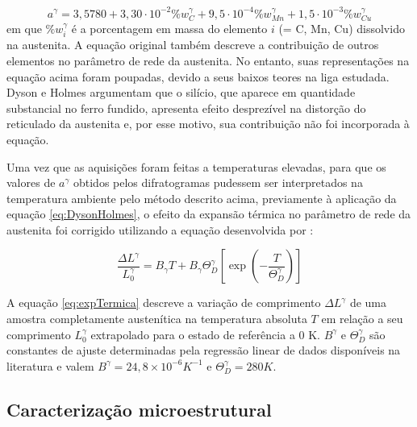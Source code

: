 \begin{equation}
	a^\gamma = 3,5780 + 3,30\cdot10^{-2} \%w_C^\gamma + 9,5\cdot10^{-4} \%w_{Mn}^\gamma + 1,5\cdot10^{-3} \%w_{Cu}^\gamma
	\label{eq:DysonHolmes}
\end{equation}
%
em que $\%w_i^\gamma$ é a porcentagem em massa do elemento $i$ (= C, Mn, Cu) dissolvido na austenita. A equação original também descreve a contribuição de outros elementos no parâmetro de rede da austenita. No entanto, suas representações na equação acima foram poupadas, devido a seus baixos teores na liga estudada. Dyson e Holmes argumentam que o silício, que aparece em quantidade substancial no ferro fundido, apresenta efeito desprezível na distorção do reticulado da austenita e, por esse motivo, sua contribuição não foi incorporada à equação.

Uma vez que as aquisições foram feitas a temperaturas elevadas, para que os valores de $a^\gamma$ obtidos pelos difratogramas pudessem ser interpretados na temperatura ambiente pelo método descrito acima, previamente à aplicação da equação \ref{eq:DysonHolmes}, o efeito da expansão térmica no parâmetro de rede da austenita foi corrigido utilizando a equação desenvolvida por :

\begin{equation}
	\frac{\Delta L^\gamma}{L_0^\gamma} = B_\gamma T + B_\gamma \Theta_D^\gamma \left[ \exp{\left( -\frac{T}{\Theta_D^\gamma} \right)}\right]
	\label{eq:expTermica}
\end{equation}

A equação \ref{eq:expTermica} descreve a variação de comprimento $\Delta L^\gamma$ de uma amostra completamente austenítica na temperatura absoluta $T$ em relação a seu comprimento $L_0^\gamma$ extrapolado para o estado de referência a 0 K. $B^\gamma$ e $\Theta_D^\gamma$ são constantes de ajuste determinadas pela regressão linear de dados disponíveis na literatura e valem $B^\gamma = 24,8 \times 10^{-6} K^{-1}$ e $\Theta_D^\gamma = 280 K$.

\subsection{Caracteriza\c{c}\~{a}o microestrutural}

